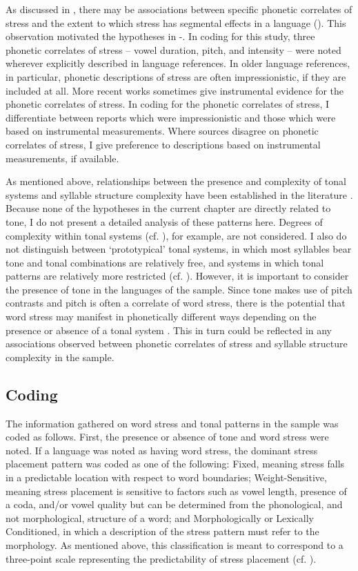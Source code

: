   As discussed in , there may be associations between specific phonetic correlates of stress and the extent to which stress has segmental effects in a language (\citealt{BybeeEtAl1998,Schiering2007}). This observation motivated the hypotheses in -. In coding for this study, three phonetic correlates of stress -- vowel duration, pitch, and intensity -- were noted wherever explicitly described in language references. In older language references, in particular, phonetic descriptions of stress are often impressionistic, if they are included at all. More recent works sometimes give instrumental evidence for the phonetic correlates of stress. In coding for the phonetic correlates of stress, I differentiate between reports which were impressionistic and those which were based on instrumental measurements. Where sources disagree on phonetic correlates of stress, I give preference to descriptions based on instrumental measurements, if available.

  As mentioned above, relationships between the presence and complexity of tonal systems and syllable structure complexity have been established in the literature \citep{Maddieson2013d}. Because none of the hypotheses in the current chapter are directly related to tone, I do not present a detailed analysis of these patterns here. Degrees of complexity within tonal systems (cf. \citealt{Maddieson2013d}), for example, are not considered. I also do not distinguish between ‘prototypical’ tonal systems, in which most syllables bear tone and tonal combinations are relatively free, and systems in which tonal patterns are relatively more restricted (cf. \citealt{Hyman2009}). However, it is important to consider the presence of tone in the languages of the sample. Since tone makes use of pitch contrasts and pitch is often a correlate of word stress, there is the potential that word stress may manifest in phonetically different ways depending on the presence or absence of a tonal system \citep{Gordon2011}. This in turn could be reflected in any associations observed between phonetic correlates of stress and syllable structure complexity in the sample. 

\subsection{Coding}\label{sec:5.2.2}

  The information gathered on word stress and tonal patterns in the sample was coded as follows. First, the presence or absence of tone and word stress were noted. If a language was noted as having word stress, the dominant stress placement pattern was coded as one of the following: Fixed, meaning stress falls in a predictable location with respect to word boundaries; Weight-Sensitive, meaning stress placement is sensitive to factors such as vowel length, presence of a coda, and/or vowel quality but can be determined from the phonological, and not morphological, structure of a word; and Morphologically or Lexically Conditioned, in which a description of the stress pattern must refer to the morphology. As mentioned above, this classification is meant to correspond to a three-point scale representing the predictability of stress placement (cf. \citealt{Schiering2007}). 

